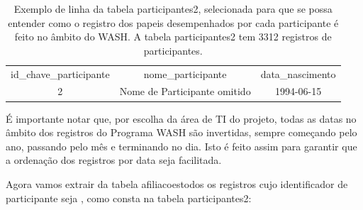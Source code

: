 \documentclass[
12pt,		%
openright,	%
twoside,  %
a4paper,			%
chapter=TITLE,		%
english,			%
french,				%
spanish,			%
brazil				%
]{USPSC-classe/USPSC}
\begin{document}
\begin{table}[htb]
\tiny
\caption{\label{2c8d9dda4031f0ea459292d025586b4d3e57ed84}Exemplo de linha da tabela participantes2, selecionada para que se possa entender como o registro dos papeis desempenhados por cada participante \'e feito no \^ambito do WASH. A tabela participantes2 tem 3312 registros de participantes.}

\centering
\begin{tabular}{|c|c|c|}
\hline
id\_chave\_participante  &  nome\_participante             &  data\_nascimento  \\
                     2  &  Nome de Participante omitido  &  1994-06-15 \\
\hline
\end{tabular}
\end{table}


\'E importante notar que, por escolha da \'area de TI do projeto, todas as datas no \^ambito dos registros do Programa WASH s\~ao invertidas, sempre come\c{c}ando pelo ano, passando pelo m\^es e terminando no dia. Isto \'e feito assim para garantir que a ordena\c{c}\~ao dos registros por data seja facilitada.

















Agora vamos extrair da tabela \textquotedbl afiliacoes\textquotedbl  todos os registros cujo identificador de participante seja \textquotedbl , como consta na tabela participantes2:
\end{document}
